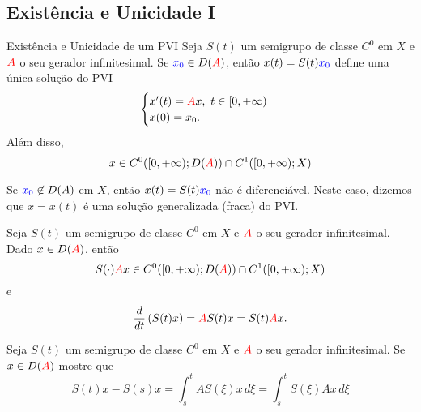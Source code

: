 

\subsection*{Existência e Unicidade I}
\begin{frame}{ }
\begin{exampleblock}{Existência e Unicidade de um PVI}
Seja $S(t)$ um semigrupo de classe $C^0$ em $X$ e ${\color{red}A}$ o seu gerador infinitesimal. Se {${\color{blue}x_0}\in D({\color{red}A})$}, então $x(t)=S(t){\color{blue}x_0}$ define {\color{blue}uma única solução} do PVI
\[
\begin{cases}
    x'(t)={\color{red}A} x,\ t\in [0,+\infty)\\
    x(0)=x_0.
\end{cases}
\]
Além disso, 
\[x\in C^0([0,+\infty);D({\color{red}A}))\cap C^1([0,+\infty);X)\]

Se {${\color{blue}x_0}\not\in D(A)$} em $X$, então $x(t)=S(t){\color{blue}x_0}$ {\color{red}não é diferenciável}. Neste caso, dizemos que $x=x(t)$ é uma {\color{blue}solução generalizada (fraca)} do PVI.
\end{exampleblock}

\end{frame}

\begin{frame}{ }
\begin{teo}
Seja $S(t)$ um semigrupo de classe $C^0$ em $X$ e ${\color{red}A}$ o seu gerador infinitesimal. Dado $x\in D({\color{red}A})$, então 
\[S{(\cdot){\color{red}A}}x\in C^0([0,+\infty);D({\color{red}A}))\cap C^1([0,+\infty);X)\]
e
\[\frac{d}{dt}\left(S(t)x\right)={\color{red}A} S(t)x=S(t){\color{red}A} x.\]
\end{teo}

\begin{exer}
Seja $S(t)$ um semigrupo de classe $C^0$ em $X$ e ${\color{red}A}$ o seu gerador infinitesimal. Se $x\in D({\color{red}A})$ mostre que
\[S(t)x-S(s)x=\int_s^t AS(\xi)x\,d\xi =\int_s^t S(\xi)Ax\,d\xi\]
\end{exer}
\end{frame}

